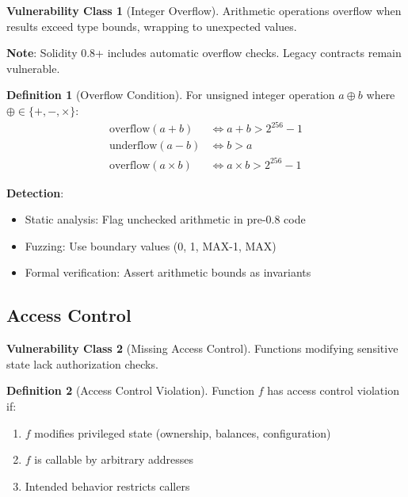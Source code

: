 \documentclass[11pt,a4paper]{article}
\theoremstyle{definition}
\newtheorem{definition}{Definition}
\newtheorem{vulnerability}{Vulnerability Class}
\begin{document}
\begin{vulnerability}[Integer Overflow]
Arithmetic operations overflow when results exceed type bounds, wrapping to unexpected values.
\end{vulnerability}

\textbf{Note}: Solidity 0.8+ includes automatic overflow checks. Legacy contracts remain vulnerable.

\begin{definition}[Overflow Condition]
For unsigned integer operation $a \oplus b$ where $\oplus \in \{+, -, \times\}$:
\begin{align*}
\text{overflow}(a + b) &\iff a + b > 2^{256} - 1 \\
\text{underflow}(a - b) &\iff b > a \\
\text{overflow}(a \times b) &\iff a \times b > 2^{256} - 1
\end{align*}
\end{definition}

\textbf{Detection}:
\begin{itemize}
    \item Static analysis: Flag unchecked arithmetic in pre-0.8 code
    \item Fuzzing: Use boundary values (0, 1, MAX-1, MAX)
    \item Formal verification: Assert arithmetic bounds as invariants
\end{itemize}

\subsection{Access Control}

\begin{vulnerability}[Missing Access Control]
Functions modifying sensitive state lack authorization checks.
\end{vulnerability}

\begin{definition}[Access Control Violation]
Function $f$ has access control violation if:
\begin{enumerate}
    \item $f$ modifies privileged state (ownership, balances, configuration)
    \item $f$ is callable by arbitrary addresses
    \item Intended behavior restricts callers
\end{enumerate}
\end{definition}
\end{document}
